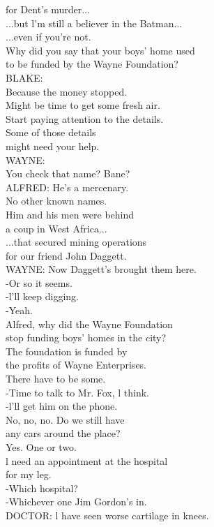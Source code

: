 \documentclass{article}
\begin{document}
\begin{multicols}{3}
for Dent's murder...\\
...but l'm still a believer in the Batman...\\
...even if you're not.\\
Why did you say that your boys' home used\\
to be funded by the Wayne Foundation?\\
BLAKE:\\
Because the money stopped.\\
Might be time to get some fresh air.\\
Start paying attention to the details.\\
Some of those details\\
might need your help.\\
WAYNE:\\
You check that name? Bane?\\
ALFRED: He's a mercenary.\\
No other known names.\\
Him and his men were behind\\
a coup in West Africa...\\
...that secured mining operations\\
for our friend John Daggett.\\
WAYNE: Now Daggett's brought them here.\\
-Or so it seems.\\
-l'll keep digging.\\
-Yeah.\\
Alfred, why did the Wayne Foundation\\
stop funding boys' homes in the city?\\
The foundation is funded by\\
the profits of Wayne Enterprises.\\
There have to be some.\\
-Time to talk to Mr. Fox, l think.\\
-l'll get him on the phone.\\
No, no, no. Do we still have\\
any cars around the place?\\
Yes. One or two.\\
l need an appointment at the hospital\\
for my leg.\\
-Which hospital?\\
-Whichever one Jim Gordon's in.\\
DOCTOR: l have seen worse cartilage in knees.\\

\end{multicols}
\end{document}
